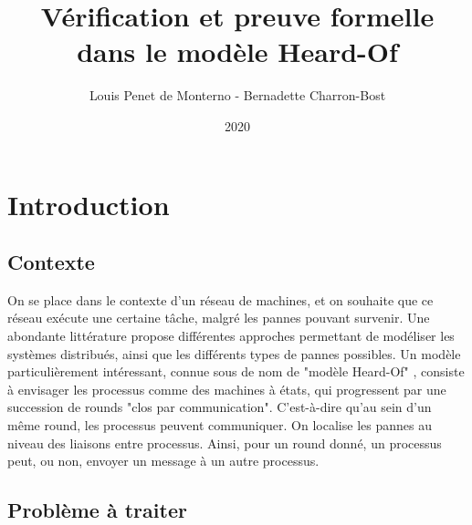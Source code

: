 \documentclass{article}
\title{Vérification et preuve formelle dans le modèle Heard-Of}
\date{2020}
\author{Louis Penet de Monterno - Bernadette Charron-Bost}
\begin{document}
\maketitle

\section{Introduction}

\subsection{Contexte}

On se place dans le contexte d'un réseau de machines, et on souhaite que ce réseau exécute une certaine tâche, malgré les pannes pouvant survenir.
Une abondante littérature propose différentes approches permettant de modéliser les systèmes distribués, ainsi que les différents types de pannes possibles.
Un modèle particulièrement intéressant, connue sous de nom de "modèle Heard-Of" \cite{model_ho},
consiste à envisager les processus comme des machines à états, qui progressent par une succession de rounds "clos par communication".
C'est-à-dire qu'au sein d'un même round, les processus peuvent communiquer.
On localise les pannes au niveau des liaisons entre processus. Ainsi, pour un round donné, un processus peut, ou non, envoyer un message à un autre processus.

\subsection{Problème à traiter}
\end{document}
